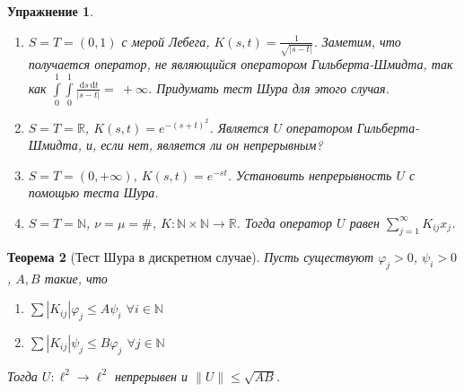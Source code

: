 \documentclass[11pt,openany,a4paper]{scrartcl}
\theoremstyle{plain}
\newtheorem{theorem}{Теорема}[subsection]
\newtheorem{exercise}[theorem]{Упражнение}
\theoremstyle{definition}
\newcommand\mb{\mathbb}
\newcommand\real{\mb R}
\newcommand{\dif}{\, \mathrm d}
\begin{document}
\begin{exercise}
\mbox{}
    \begin{enumerate}
        \item $S = T = (0, 1)$ с мерой Лебега, $K(s,t) = \frac{1}{\sqrt{|s-t|}}$.
        Заметим, что получается оператор, не являющийся
        оператором Гильберта-Шмидта, так как
        $\int\limits_0^1\int\limits_0^1 \frac{\dif s\dif t}{|s-t|} =~+\infty$.
        Придумать тест Шура для этого случая.
        \item $S = T = \real$, $K(s,t) = e^{-(s + t)^2}$. Является $U$ оператором
        Гильберта-Шмидта, и, если нет, является ли он непрерывным?
        \item $S = T = (0, +\infty)$, $K(s,t) = e^{-st}$. Установить непрерывность
        $U$ с помощью теста Шура.
        \item $S = T = \mb N$, $\nu = \mu = \#$,
        $K: \mb N \times \mb N \to \real$. Тогда оператор $U$ равен
        $\sum\limits_{j=1}^\infty K_{ij}x_j$.
    \end{enumerate}
\end{exercise}
\begin{theorem}[Тест Шура в дискретном случае]
    Пусть существуют $\varphi_j > 0$, $\psi_i > 0$, $A, B$ такие, что
    \begin{enumerate}
        \item $\sum |K_{ij}|\varphi_j \leqslant A\psi_i$ $\forall i \in \mb N$
        \item $\sum |K_{ij}|\psi_j \leqslant B\varphi_j$ $\forall j \in \mb N$
    \end{enumerate}
    Тогда $U: \ell^2 \to \ell^2$ непрерывен и $\|U\| \leqslant \sqrt{AB}$.
\end{theorem}
\end{document}
